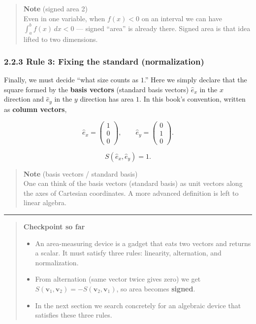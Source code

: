 \begin{quote}
\textbf{Note} (signed area 2)\\
Even in one variable, when \(f(x)<0\) on an interval we can have
\(\displaystyle\int_a^b f(x)\,dx<0\) --- signed ``area'' is already
there. Signed area is that idea lifted to two dimensions.
\end{quote}

\hypertarget{rule-3-fixing-the-standard-normalization}{%
\subsubsection{2.2.3 Rule 3: Fixing the standard
(normalization)}\label{rule-3-fixing-the-standard-normalization}}

Finally, we must decide ``what size counts as \(1\).'' Here we simply
declare that the square formed by the \textbf{basis vectors} (standard
basis vectors) \(\hat{e}_x\) in the \(x\) direction and \(\hat{e}_y\) in
the \(y\) direction has area \(1\). In this book's convention, written
as \textbf{column vectors},

\[\hat{e}_x=\begin{pmatrix}1\\0\\0\end{pmatrix},\qquad
\hat{e}_y=\begin{pmatrix}0\\1\\0\end{pmatrix}.\]

\[S(\hat{e}_x,\hat{e}_y)=1.\]

\begin{quote}
\textbf{Note} (basis vectors / standard basis)\\
One can think of the basis vectors (standard basis) as unit vectors
along the axes of Cartesian coordinates. A more advanced definition is
left to linear algebra.
\end{quote}

\begin{center}\rule{0.5\linewidth}{0.5pt}\end{center}

\begin{quote}
\textbf{Checkpoint so far}

\begin{itemize}
\item
  An area-measuring device is a gadget that eats two vectors and returns
  a scalar. It must satisfy three rules: linearity, alternation, and
  normalization.
\item
  From alternation (same vector twice gives zero) we get
  \(S(\mathbf{v}_1,\mathbf{v}_2)=-S(\mathbf{v}_2,\mathbf{v}_1)\), so
  area becomes \textbf{signed}.
\item
  In the next section we search concretely for an algebraic device that
  satisfies these three rules.
\end{itemize}
\end{quote}

